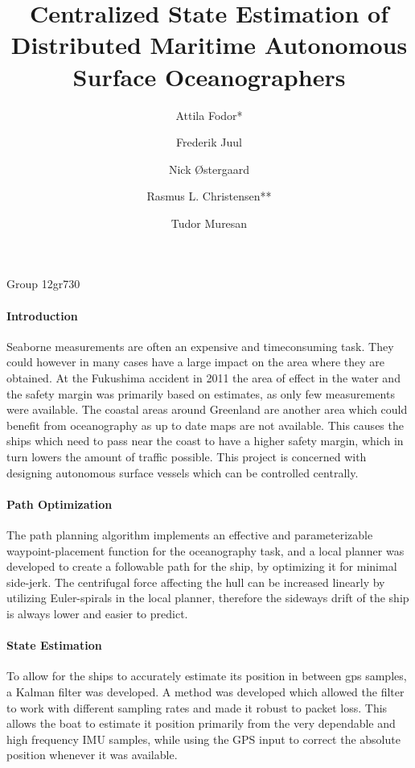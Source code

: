 \documentclass[a4paper,12pt]{memoir}
\begin{document}
\title{Centralized State Estimation of Distributed Maritime Autonomous Surface Oceanographers}
\author{Attila Fodor* \and Frederik Juul \and Nick \O stergaard \and Rasmus L. Christensen** \and Tudor Muresan}
\maketitle
\begin{center}
\vspace{-0.7cm}
Group 12gr730
\end{center}
\thispagestyle{empty}
\paragraph{Introduction}
Seaborne measurements are often an expensive and timeconsuming task. They could however in many cases have a large impact on the area where they are obtained. At the Fukushima accident in 2011 the area of effect in the water and the safety margin was primarily based on estimates, as only few measurements were available. The coastal areas around Greenland are another area which could benefit from oceanography as up to date maps are not available. This causes the ships which need to pass near the coast to have a higher safety margin, which in turn lowers the amount of traffic possible. This project is concerned with designing autonomous surface vessels which can be controlled centrally. 

\paragraph{Path Optimization}
The path planning algorithm implements an effective and
parameterizable waypoint-placement function for the oceanography task,
and a local planner was developed to create a followable path for the
ship, by optimizing it for minimal side-jerk. The centrifugal force
affecting the hull can be increased linearly by utilizing
Euler-spirals in the local planner, therefore the sideways drift of
the ship is always lower and easier to predict.

\paragraph{State Estimation}
To allow for the ships to accurately estimate its position in between gps samples, a Kalman filter was developed. A method was developed which allowed the filter to work with different sampling rates and made it robust to packet loss. This allows the boat to estimate it position primarily from the very dependable and high frequency IMU samples, while using the GPS input to correct the absolute position whenever it was available.
\end{document}
